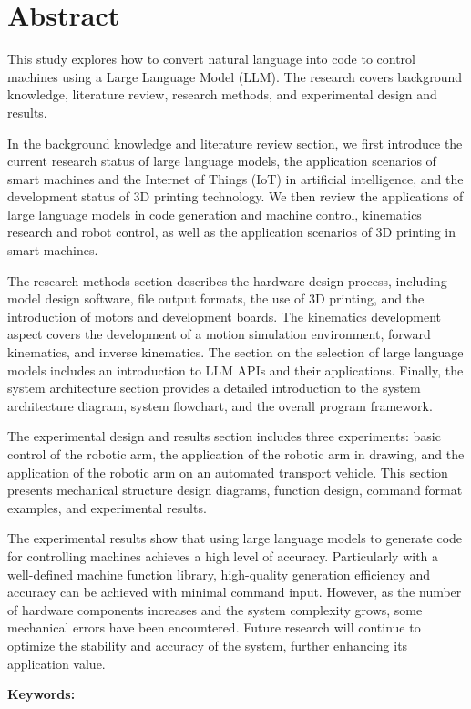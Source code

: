 \documentclass[class=NCU_thesis, crop=false]{standalone}
\begin{document}
\chapter{Abstract}

This study explores how to convert natural language into code to control machines using a Large Language Model (LLM). The research covers background knowledge, literature review, research methods, and experimental design and results.

In the background knowledge and literature review section, we first introduce the current research status of large language models, the application scenarios of smart machines and the Internet of Things (IoT) in artificial intelligence, and the development status of 3D printing technology. We then review the applications of large language models in code generation and machine control, kinematics research and robot control, as well as the application scenarios of 3D printing in smart machines.

The research methods section describes the hardware design process, including model design software, file output formats, the use of 3D printing, and the introduction of motors and development boards. The kinematics development aspect covers the development of a motion simulation environment, forward kinematics, and inverse kinematics. The section on the selection of large language models includes an introduction to LLM APIs and their applications. Finally, the system architecture section provides a detailed introduction to the system architecture diagram, system flowchart, and the overall program framework.

The experimental design and results section includes three experiments: basic control of the robotic arm, the application of the robotic arm in drawing, and the application of the robotic arm on an automated transport vehicle. This section presents mechanical structure design diagrams, function design, command format examples, and experimental results.

The experimental results show that using large language models to generate code for controlling machines achieves a high level of accuracy. Particularly with a well-defined machine function library, high-quality generation efficiency and accuracy can be achieved with minimal command input. However, as the number of hardware components increases and the system complexity grows, some mechanical errors have been encountered. Future research will continue to optimize the stability and accuracy of the system, further enhancing its application value.

\vspace{2em}
\noindent \textbf{Keywords:} \keywordsEn{} %
\end{document}
